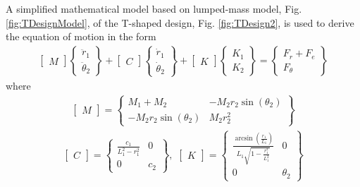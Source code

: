 \documentclass[twoside]{article}
\begin{document}
A simplified mathematical model based on lumped-mass model, Fig. \ref{fig:TDesignModel},  of the T-shaped design, Fig. \ref{fig:TDesign2}, is used to derive the equation of motion in the form
\begin{align}
\label{Eq1}
\begin{bmatrix} M \end{bmatrix}
\begin{Bmatrix} \ddot{r}_1 \\ \ddot{\theta}_2  \end{Bmatrix} + 
\begin{bmatrix} C \end{bmatrix}
\begin{Bmatrix} \dot{r}_1 \\ \dot{\theta}_2  \end{Bmatrix} +
\begin{bmatrix} K \end{bmatrix}
\begin{Bmatrix} K_1 \\ K_2  \end{Bmatrix} =  \begin{Bmatrix} F_{r} + F_e  \\ F_\theta \end{Bmatrix}
\end{align}%
where
\begin{align}
\begin{bmatrix} M \end{bmatrix}
 =  \begin{Bmatrix} M_1+M_2 & -M_2 r_2 \sin(\theta_2) \\ -M_2 r_2 \sin(\theta_2) & M_2 r_2^2 \end{Bmatrix} \nonumber
\end{align}
\begin{align}
\begin{bmatrix} C \end{bmatrix}
=  \begin{Bmatrix} \frac{c_1}{L_1^2 - r_1^2} & 0  \\ 0 & c_2 \end{Bmatrix},\,\,
\begin{bmatrix} K \end{bmatrix}
=  \begin{Bmatrix} \frac{\arcsin(\frac{r_1}{L_1})}{L_1\sqrt{1-\frac{r_1^2}{L_1^2}}} & 0  \\ 0 & \theta_2 \end{Bmatrix}\nonumber
\end{align}
\end{document}
